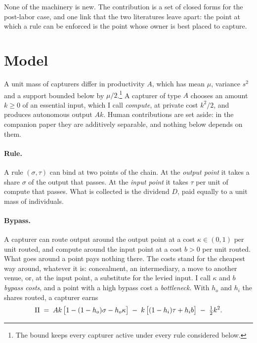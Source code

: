 None of the machinery is new. The contribution is a set of closed forms for the
post-labor case, and one link that the two literatures leave apart: the point at which a
rule can be enforced is the point whose owner is best placed to capture.

\section{Model}

A unit mass of capturers differ in productivity $A$, which has mean $\mu$, variance $s^2$
and a support bounded below by $\mu/2$.\footnote{The bound keeps every capturer active
under every rule considered below.} A capturer of type $A$ chooses an amount $k\ge 0$ of
an essential input, which I call \emph{compute}, at private cost $k^2/2$, and produces
autonomous output $Ak$. Human contributions are set aside: in the companion paper they
are additively separable, and nothing below depends on them.

\paragraph{Rule.} A rule $(\sigma,\tau)$ can bind at two points of the chain. At the
\emph{output point} it takes a share $\sigma$ of the output that passes. At the
\emph{input point} it takes $\tau$ per unit of compute that passes. What is collected is
the dividend $D$, paid equally to a unit mass of individuals.

\paragraph{Bypass.} A capturer can route output around the output point at a cost
$\kappa\in(0,1)$ per unit routed, and compute around the input point at a cost $b>0$ per
unit routed. What goes around a point pays nothing there. The costs stand for the
cheapest way around, whatever it is: concealment, an intermediary, a move to another
venue, or, at the input point, a substitute for the levied input. I call $\kappa$ and $b$
\emph{bypass costs}, and a point with a high bypass cost a \emph{bottleneck}. With $h_o$
and $h_i$ the shares routed, a capturer earns
\begin{equation}
  \Pi \;=\; Ak\,\bigl[1-(1-h_o)\sigma-h_o\kappa\bigr]
        \;-\;k\,\bigl[(1-h_i)\tau+h_i b\bigr]\;-\;\tfrac{1}{2} k^2 .
\end{equation}

